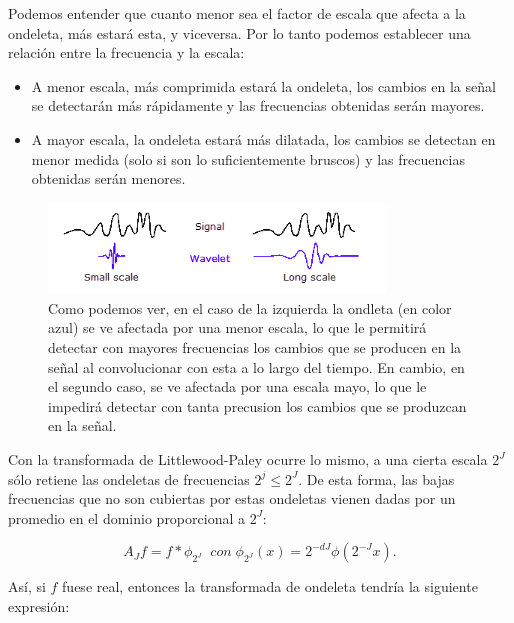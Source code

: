 \medskip
 
\noindent Podemos entender que cuanto menor sea el factor de escala que afecta a la ondeleta, más  estará esta, y viceversa. Por lo tanto podemos establecer una relación entre la frecuencia y la escala: 

\begin{itemize}
  \item A menor escala, más comprimida estará la ondeleta, los cambios en la señal se detectarán más rápidamente y las frecuencias obtenidas serán mayores. 
  \item A mayor escala, la ondeleta estará más dilatada, los cambios se detectan en menor medida (solo si son lo suficientemente bruscos) y las frecuencias obtenidas serán menores.
\end{itemize}

\begin{figure} [!h]
  \centering
  \includegraphics[width=0.8\textwidth]{img/Relacion_escala_frecuencia.png}
  \caption{Como podemos ver, en el caso de la izquierda la ondleta (en color azul) se ve afectada por una menor escala, lo que le permitirá detectar con mayores frecuencias los cambios que se producen en la señal al convolucionar con esta a lo largo del tiempo. En cambio, en el segundo caso, se ve afectada por una escala mayo, lo que le impedirá detectar con tanta precusion los cambios que se produzcan en la señal.}
  \label{fig:scattering_propagator}
\end{figure}

\medskip

\noindent Con la transformada de Littlewood-Paley ocurre lo mismo, a una cierta escala $2^J$ sólo retiene las ondeletas de frecuencias $2^j \leq 2^{J}$. De esta forma, las bajas frecuencias que no son cubiertas por estas ondeletas vienen dadas por un promedio en el dominio proporcional a $2^J$:

\begin{equation}
  A_Jf=f \ast \phi_ {2^J} \; \; con \; \phi_ {2^J}(x)=2^{-dJ} \phi(2^{-J}x).
\end{equation}

\medskip

\noindent Así, si $f$ fuese real, entonces la transformada de ondeleta tendría la siguiente expresión: 

